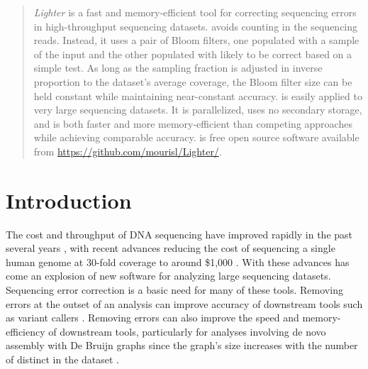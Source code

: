 \documentclass[10pt]{article}
\begin{document}
\begin{abstract}
\emph{Lighter} is a fast and memory-efficient tool for correcting sequencing errors in high-throughput sequencing datasets.
\tool avoids counting \kmers in the sequencing reads.
Instead, it uses a pair of Bloom filters, one populated with a sample of the input \kmers and the other populated with \kmers likely to be correct based on a simple test.
As long as the sampling fraction is adjusted in inverse proportion to the dataset's average coverage, the Bloom filter size can be held constant while maintaining near-constant accuracy.
\tool is easily applied to very large sequencing datasets.
It is parallelized, uses no secondary storage, and is both faster and more memory-efficient than competing approaches while achieving comparable accuracy.
\tool is free open source software available from \url{https://github.com/mourisl/Lighter/}.
\end{abstract}




\section*{Introduction}
The cost and throughput of DNA sequencing have improved rapidly in the past several years \cite{glenn2011field}, with recent advances reducing the cost of sequencing a single human genome at 30-fold coverage to around \$1,000 \cite{1kgenomeforreal}.
With these advances has come an explosion of new software for analyzing large sequencing datasets.
Sequencing error correction is a basic need for many of these tools.
Removing errors at the outset of an analysis can improve accuracy of downstream tools such as variant callers \cite{kelley2010quake}.
Removing errors can also improve the speed and memory-efficiency of downstream tools, particularly for analyses involving de novo assembly with De Bruijn graphs since the graph's size increases with the number of distinct \kmers in the dataset \cite{pevzner2001eulerian, chaisson2004fragment}.
\end{document}
